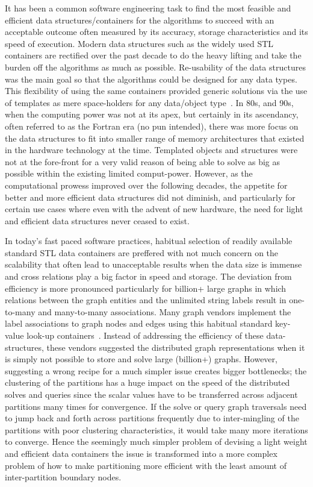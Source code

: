 \documentclass[preprint,3p,twocolumn]{elsarticle}
\begin{document}
It has been a common software engineering task to find the most feasible and efficient data structures/containers for the algorithms to succeed with an acceptable outcome often measured by its accuracy, storage characteristics and its speed of execution. Modern data structures such as the widely used STL~\cite{stl} containers are rectified over the past decade to do the heavy lifting and take the burden off the algorithms as much as possible. Re-usability of the data structures was the main goal so that the  algorithms could be designed for any data types. This flexibility of using the same containers provided generic solutions via the use of templates as mere space-holders for any data/object type~\cite{cppdata}. In 80s, and 90s, when the computing power was not at its apex, but certainly in its  ascendancy, often referred to as the Fortran era (no pun intended), there was more focus on the data structures to fit into smaller range of memory architectures that existed in the hardware technology at the time. Templated objects and structures were not at the fore-front for a very valid reason of being able to solve as big as possible within the existing limited comput-power. However, as the computational prowess improved over the following decades, the appetite for better and more efficient data structures did not diminish, and particularly for certain use cases where even with the advent of new hardware, the need for light and efficient data structures never ceased to exist. 

In today's fast paced software practices, habitual selection of readily available standard STL data containers are preffered with not much concern on the scalability that often lead to unacceptable results when the data size is immense and cross relations play a big factor in speed and storage. The deviation from efficiency is more pronounced particularly for billion+ large graphs in which relations between the graph entities and the unlimited string labels result in one-to-many and many-to-many associations. Many graph vendors implement the label associations to graph nodes and edges using this habitual standard key-value look-up containers~\cite{graphdbs, neo4j, tiger, networkx}. Instead of addressing the efficiency of these data-structures, these vendors suggested the distributed graph representations when it is simply not possible to store and solve large (billion+) graphs. However, suggesting a wrong recipe for a much simpler issue creates bigger bottlenecks; the clustering of the partitions has a huge impact on the speed of the distributed solves and queries since the scalar values have to be transferred across adjacent partitions many times for convergence. If the solve or query graph traversals need to jump back and forth across partitions frequently due to inter-mingling of the partitions with poor clustering characteristics, it would take many more iterations to converge. Hence the seemingly much simpler problem of devising a light weight and efficient data containers the issue is transformed into a more complex problem of how to make partitioning more efficient with the least amount of inter-partition boundary nodes. 
\end{document}
